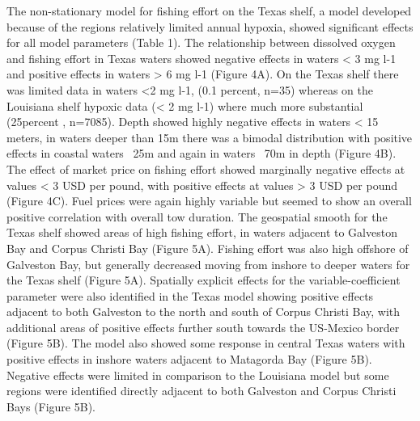 \documentclass[10pt]{article}
\begin{document}
The non-stationary model for fishing effort on the Texas shelf, a model developed because of the regions relatively limited annual hypoxia, showed significant effects for all model parameters (Table 1).  The relationship between dissolved oxygen and fishing effort in Texas waters showed negative effects in waters < 3 mg l-1 and positive effects in waters > 6 mg l-1 (Figure 4A).  On the Texas shelf there was limited data in waters <2 mg l-1, (0.1 percent, n=35) whereas on the Louisiana shelf hypoxic data (< 2 mg l-1) where much more substantial (25percent , n=7085).  Depth showed highly negative effects in waters < 15 meters, in waters deeper than 15m there was a bimodal distribution with positive effects in coastal waters ~25m and again in waters ~70m in depth (Figure 4B).  The effect of market price on fishing effort showed marginally negative effects at values < 3 USD per pound, with positive effects at values > 3 USD per pound (Figure 4C).  Fuel prices were again highly variable but seemed to show an overall positive correlation with overall tow duration.  The geospatial smooth for the Texas shelf showed areas of high fishing effort, in waters adjacent to Galveston Bay and Corpus Christi Bay (Figure 5A).  Fishing effort was also high offshore of Galveston Bay, but generally decreased moving from inshore to deeper waters for the Texas shelf (Figure 5A).  Spatially explicit effects for the variable-coefficient parameter were also identified in the Texas model showing positive effects adjacent to both Galveston to the north and south of Corpus Christi Bay, with additional areas of positive effects further south towards the US-Mexico border (Figure 5B).  The model also showed some response in central Texas waters with positive effects in inshore waters adjacent to Matagorda Bay (Figure 5B).  Negative effects were limited in comparison to the Louisiana model but some regions were identified directly adjacent to both Galveston and Corpus Christi Bays (Figure 5B).  
\end{document}
